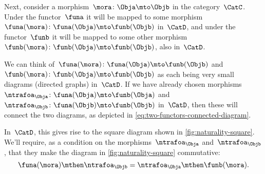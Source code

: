 Next, consider a morphism~$\mora \colon \Obja \mto \Objb$ in the category~$\CatC$.
Under the functor~$\funa$ it will be mapped to some morphism~$\funa(\mora)\colon \funa(\Obja) \mto \funb(\Objb)$ in~$\CatD$, and under the functor~$\funb$ it will be mapped to some other morphism~$\funb(\mora)\colon \funb(\Obja) \mto \funb(\Objb)$, also in~$\CatD$.

We can think of~$\funa(\mora)\colon \funa(\Obja) \mto \funb(\Objb)$ and~$\funb(\mora)\colon \funb(\Obja) \mto \funb(\Objb)$ as each being very small diagrams (directed graphs) in~$\CatD$.
If we have already chosen morphisms~$\ntrafoa_\Obja\colon \funa(\Obja) \mto \funb(\Obja)$ and~$\ntrafoa_\Objb\colon \funa(\Objb) \mto \funb(\Objb)$ in~$\CatD$, then these will connect the two diagrams, as depicted in \cref{eq:two-functors-connected-diagram}.
%

In~$\CatD$, this gives rise to the square diagram shown in \cref{fig:naturality-square}.
We'll require, as a condition on the morphisms~$\ntrafoa_\Obja$ and~$\ntrafoa_\Objb$, that they make the diagram in \cref{fig:naturality-square} commutative:
\begin{equation}
    \funa(\mora) \mthen \ntrafoa_\Objb = \ntrafoa_\Obja \mthen \funb(\mora).
\end{equation}

%
\begin{marginfigure}
    \centering
    \caption{}
    \label{fig:naturality-square}
\end{marginfigure}
%

